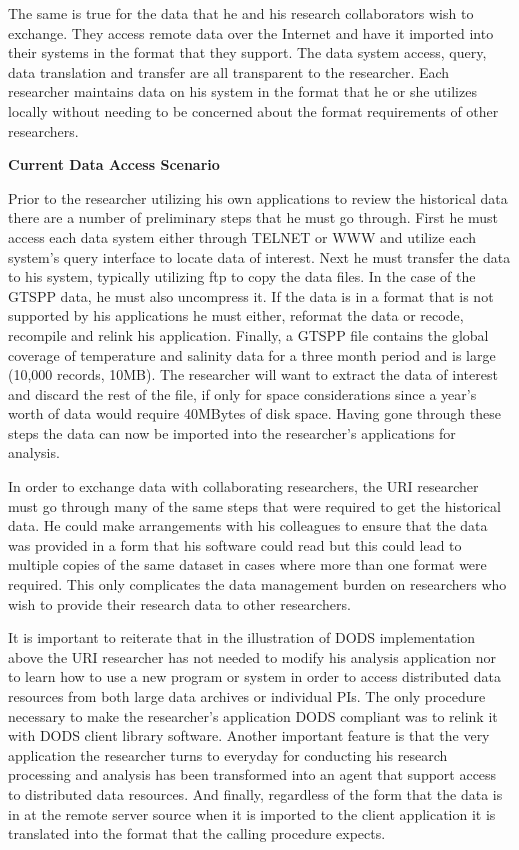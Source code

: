 The same is true for the data that he and his research collaborators wish to
exchange.  They access remote data over the Internet and have it imported
into their systems in the format that they support.  The data system access,
query, data translation and transfer are all transparent to the researcher.
Each researcher maintains data on his system in the format that he or she
utilizes locally without needing to be concerned about the format
requirements of other researchers.

\medskip \centerline{\bf Current Data Access Scenario} Prior to the
researcher utilizing his own applications to review the historical data there
are a number of preliminary steps that he must go through.  First he must
access each data system either through TELNET or WWW and utilize each
system's query interface to locate data of interest.  Next he must transfer
the data to his system, typically utilizing ftp to copy the data files.  In the case of the GTSPP data, he must also uncompress it.  If the
data is in a format that is not supported by his applications he must either,
reformat the data or recode, recompile and relink his application.  Finally, a GTSPP file contains
the global coverage of temperature and salinity data for a three month period
and is large (10,000 records, 10MB).  The researcher
will want to extract the data of interest and discard the rest of the file,
if only for space considerations since a year's worth of data would require
40MBytes of disk space.  Having gone through these steps the data can now be
imported into the researcher's applications for analysis.

In order to exchange data with collaborating researchers, the URI researcher
must go through many of the same steps that were required to get the
historical data.  He could make arrangements with his colleagues to ensure
that the data was provided in a form that his software could read but this
could lead to multiple copies of the same dataset in cases where more than
one format were required.  This only complicates the data management burden
on researchers who wish to provide their research data to other researchers.

It is important to reiterate that in the illustration of DODS implementation
above the URI researcher has not needed to modify his analysis application
nor to learn how to use a new program or system in order to access
distributed data resources from both large data archives or individual PIs.
The only procedure necessary to make the researcher's application DODS
compliant was to relink it with DODS client library software.  Another
important feature is that the very application the researcher turns to
everyday for conducting his research processing and analysis has been
transformed into an agent that support access to distributed data resources.
And finally, regardless of the form that the data is in at the remote server
source when it is imported to the client application it is translated into
the format that the calling procedure expects.

